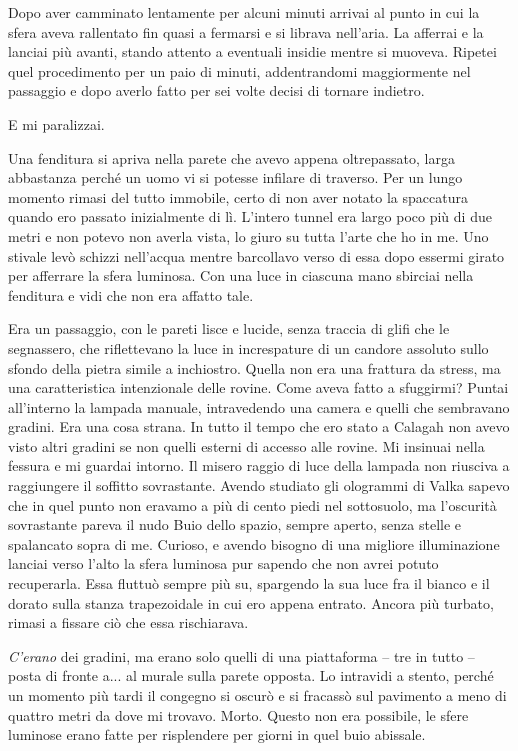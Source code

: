 Dopo aver camminato lentamente per alcuni minuti arrivai al punto in cui
la sfera aveva rallentato fin quasi a fermarsi e si librava nell'aria.
La afferrai e la lanciai più avanti, stando attento a eventuali insidie
mentre si muoveva. Ripetei quel procedimento per un paio di minuti,
addentrandomi maggiormente nel passaggio e dopo averlo fatto per sei
volte decisi di tornare indietro.

E mi paralizzai.

Una fenditura si apriva nella parete che avevo appena oltrepassato,
larga abbastanza perché un uomo vi si potesse infilare di traverso. Per
un lungo momento rimasi del tutto immobile, certo di non aver notato la
spaccatura quando ero passato inizialmente di lì. L'intero tunnel era
largo poco più di due metri e non potevo non averla vista, lo giuro su
tutta l'arte che ho in me. Uno stivale levò schizzi nell'acqua mentre
barcollavo verso di essa dopo essermi girato per afferrare la sfera
luminosa. Con una luce in ciascuna mano sbirciai nella fenditura e vidi
che non era affatto tale.

Era un passaggio, con le pareti lisce e lucide, senza traccia di glifi
che le segnassero, che riflettevano la luce in increspature di un
candore assoluto sullo sfondo della pietra simile a inchiostro. Quella
non era una frattura da stress, ma una caratteristica intenzionale delle
rovine. Come aveva fatto a sfuggirmi? Puntai all'interno la lampada
manuale, intravedendo una camera e quelli che sembravano gradini. Era
una cosa strana. In tutto il tempo che ero stato a Calagah non avevo
visto altri gradini se non quelli esterni di accesso alle rovine. Mi
insinuai nella fessura e mi guardai intorno. Il misero raggio di luce
della lampada non riusciva a raggiungere il soffitto sovrastante. Avendo
studiato gli ologrammi di Valka sapevo che in quel punto non eravamo a
più di cento piedi nel sottosuolo, ma l'oscurità sovrastante pareva il
nudo Buio dello spazio, sempre aperto, senza stelle e spalancato sopra
di me. Curioso, e avendo bisogno di una migliore illuminazione lanciai
verso l'alto la sfera luminosa pur sapendo che non avrei potuto
recuperarla. Essa fluttuò sempre più su, spargendo la sua luce fra il
bianco e il dorato sulla stanza trapezoidale in cui ero appena entrato.
Ancora più turbato, rimasi a fissare ciò che essa rischiarava.

\emph{C'erano} dei gradini, ma erano solo quelli di una piattaforma --
tre in tutto -- posta di fronte a... al murale sulla parete opposta. Lo
intravidi a stento, perché un momento più tardi il congegno si oscurò e
si fracassò sul pavimento a meno di quattro metri da dove mi trovavo.
Morto. Questo non era possibile, le sfere luminose erano fatte per
risplendere per giorni in quel buio abissale.

